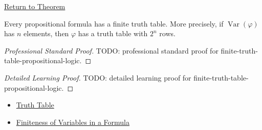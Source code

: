 \newpage
{}
\label{prf:finite-truth-table-propositional-logic}

\begin{remark*}[Return]
\hyperref[thm:finite-truth-table-propositional-logic]{Return to Theorem}
\end{remark*}

\begin{theorem*}
Every propositional formula has a finite truth table. More precisely, if \(\operatorname{Var}(\varphi)\) has \(n\) elements, then \(\varphi\) has a truth table with \(2^n\) rows.
\end{theorem*}

\begin{proof}[Professional Standard Proof]
\LRAProofBodyStart
TODO: professional standard proof for finite-truth-table-propositional-logic.
\end{proof}

\begin{proof}[Detailed Learning Proof]
\LRAProofBodyStart
TODO: detailed learning proof for finite-truth-table-propositional-logic.
\end{proof}

\begin{remark*}
\end{remark*}

\begin{dependencies}
\begin{itemize}
  \item \hyperref[def:truth-table-propositional-logic]{Truth Table}
  \item \hyperref[lem:finiteness-of-variables-propositional-formulas]{Finiteness of Variables in a Formula}
\end{itemize}
\end{dependencies}

\clearpage
